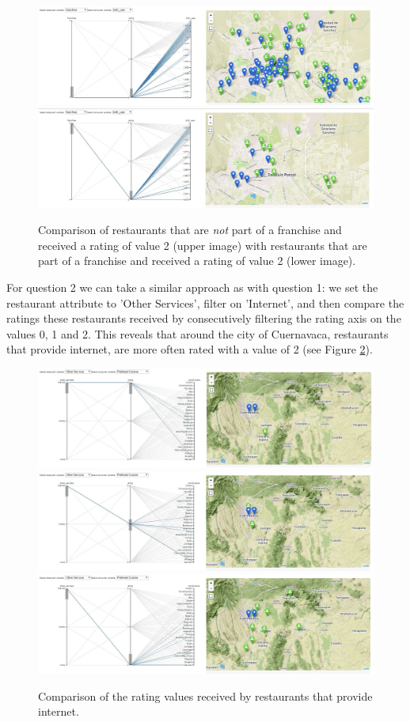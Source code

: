 \begin{figure}[h]
    \centering
    \captionsetup{justification=centering,margin=0.5cm}
    \includegraphics[width=.8\textwidth]{img/task1q1a.jpg}
    \includegraphics[width=.8\textwidth]{img/task1q1b.jpg}
    \caption{Comparison of restaurants that are \emph{not} part of a franchise and received a rating of value 2 (upper image) with restaurants that are part of a franchise and received a rating of value 2 (lower image).}
    \label{fig:task1q1}
\end{figure}

For question 2 we can take a similar approach as with question 1: we set the restaurant attribute to 'Other Services', filter on 'Internet', and then compare the ratings these restaurants received by consecutively filtering the rating axis on the values 0, 1 and 2. This reveals that around the city of Cuernavaca, restaurants that provide internet, are more often rated with a value of 2 (see Figure \ref{fig:task1q2}).

\begin{figure}[h]
    \centering
    \captionsetup{justification=centering,margin=0.5cm}
    \includegraphics[width=.8\textwidth]{img/task1q2a.jpg}
    \includegraphics[width=.8\textwidth]{img/task1q2b.jpg}
    \includegraphics[width=.8\textwidth]{img/task1q2c.jpg}
    \caption{Comparison of the rating values received by restaurants that provide internet.}
    \label{fig:task1q2}
\end{figure}


